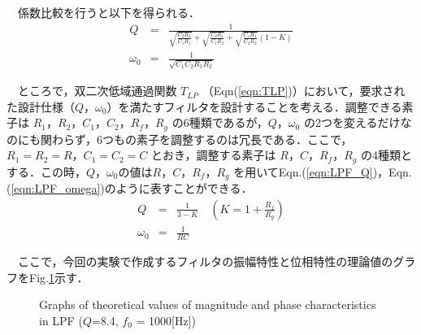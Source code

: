 　係数比較を行うと以下を得られる．
\begin{eqnarray}
    Q &=& \frac{1}{\sqrt{\frac{C_{2} R_{2}}{C_{1} R_{1}}}+\sqrt{\frac{C_{2} R_{1}}{C_{1} R_{2}}}+\sqrt{\frac{C_{1} R_{1}}{C_{2} R_{2}}}(1-K)} \nonumber\\
    \omega_0 &=& \frac{1}{\sqrt{C_{1} C_{2} R_{1} R_{2}}} \nonumber
\end{eqnarray}

　ところで，双二次低域通過関数 $T_{LP}$ （Eqn(\ref{eqn:TLP})）において，要求された設計仕様（$Q$，$\omega_0$）を満たすフィルタを設計することを考える．調整できる素子は $R_1$，$R_2$，$C_1$，$C_2$，$R_f$，$R_g$ の6種類であるが，$Q$，$\omega_0$ の2つを変えるだけなのにも関わらず，6つもの素子を調整するのは冗長である．ここで，$R_1 = R_2 = R$，$C_1 = C_2 = C$ とおき，調整する素子は $R$，$C$，$R_f$，$R_g$ の4種類とする．この時，$Q$，$\omega_0$の値は$R$，$C$，$R_f$，$R_g$ を用いてEqn.(\ref{eqn:LPF_Q})，Eqn.(\ref{eqn:LPF_omega})のように表すことができる．
\begin{eqnarray}
    Q &=& \frac{1}{3-K} \quad\left(K=1+\frac{R_{f}}{R_{g}}\right)
    \label{eqn:LPF_Q} \\
    \omega_0 &=& \frac{1}{R C}
    \label{eqn:LPF_omega}
\end{eqnarray}

　ここで，今回の実験で作成するフィルタの振幅特性と位相特性の理論値のグラフをFig.\ref{fig:LPF_graph}示す．
\begin{figure}[H]
    \begin{center}
    \hspace{5truemm}
    \end{center}
    \caption{Graphs of theoretical values of magnitude and phase characteristics in LPF ($Q$=8.4, $f_0$ = 1000[Hz])}
    \label{fig:LPF_graph}
\end{figure}

